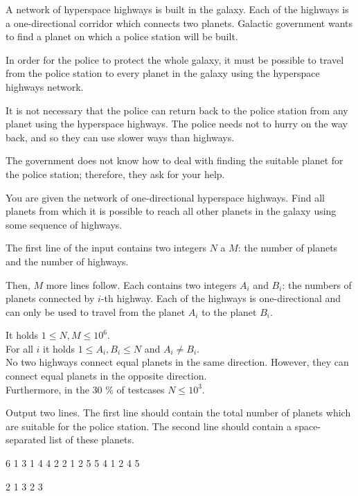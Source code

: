 





A network of hyperspace highways is built in the galaxy. Each of the highways
is a one-directional corridor which connects two planets. Galactic government
wants to find a planet on which a police station will be built.

In order for the police to protect the whole galaxy, it must be possible to
travel from the police station to every planet in the galaxy using the
hyperspace highways network.

It is not necessary that the police can return back to the police station from
any planet using the hyperspace highways. The police needs not to hurry on the
way back, and so they can use slower ways than highways.

The government does not know how to deal with finding the suitable planet for
the police station; therefore, they ask for your help.


You are given the network of one-directional hyperspace highways. Find all
planets from which it is possible to reach all other planets in the galaxy using
some sequence of highways.


The first line of the input contains two integers $N$ a $M$: the number of
planets and the number of highways.

Then, $M$ more lines follow. Each contains two integers $A_i$ and $B_i$: the
numbers of planets connected by $i$-th highway. Each of the highways is
one-directional and can only be used to travel from the planet $A_i$ to the
planet $B_i$.

\bigskip
\noindent
It holds $1 \leq N, M \leq 10^6$.\\
For all $i$ it holds $1 \leq A_i, B_i \leq N$ and $A_i \neq B_i$.\\
No two highways connect equal planets in the same direction. However, they can
  connect equal planets in the opposite direction.\\
Furthermore, in the 30 \% of testcases $N \leq 10^3$.


Output two lines. The first line should contain the total number of planets
which are suitable for the police station. The second line should contain
a space-separated list of these planets.


 6
1 3
1 4
4 2
2 1
2 5
5 4
1 2 4 5
\sampleEND

 2
1 3
2 3
~
\sampleEND


